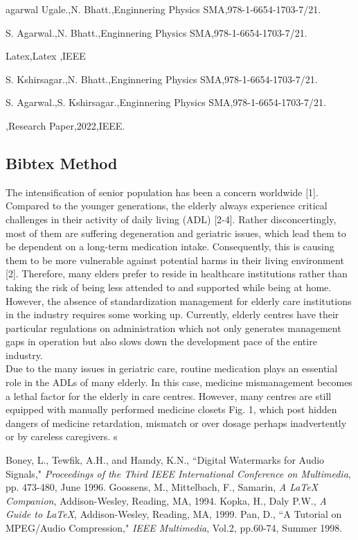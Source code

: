 \documentclass[12pt]{article}
\begin{document}
\begin{thebibliography} {}

agarwal Ugale.,N. Bhatt.,Enginnering Physics SMA,978-1-6654-1703-7/21.

 S. Agarwal.,N. Bhatt.,Enginnering Physics SMA,978-1-6654-1703-7/21.

 Latex,Latex ,IEEE

 S. Kshirsagar.,N. Bhatt.,Enginnering Physics SMA,978-1-6654-1703-7/21.

 S. Agarwal.,S. Kshirsagar.,Enginnering Physics SMA,978-1-6654-1703-7/21.

 ,Research Paper,2022,IEEE.
\end{thebibliography}
\newpage
\subsection{Bibtex Method}

The intensification of senior population has been a concern worldwide [1].
Compared to the younger generations, the elderly always experience critical
challenges in their activity of daily living (ADL) [2-4]. Rather disconcertingly,
most of them are suffering degeneration and geriatric issues, which lead them to be dependent on a long-term medication intake. Consequently, this is causing them to be more vulnerable against potential harms in their living environment [2].
Therefore, many elders prefer to reside in healthcare institutions rather than taking the risk of being less attended to and supported while being at home.\\ However, the absence of standardization management for elderly care institutions in the industry requires some working up. Currently, elderly centres have their particular regulations on administration which not only generates management gaps in operation but also slows down the development pace of the entire industry.\\
Due to the many issues in geriatric care, routine medication plays an essential
role in the ADLs of many elderly. In this case, medicine mismanagement becomes
a lethal factor for the elderly in care centres. However, many centres are still
equipped with manually performed medicine closets Fig. 1, which post hidden
dangers of medicine retardation, mismatch or over dosage perhaps inadvertently or
by careless caregivers. s


\begin{thebibliography} {}

 Boney, L., Tewfik, A.H., and Hamdy, K.N., ``Digital
Watermarks for Audio Signals," \emph{Proceedings of the Third IEEE
International Conference on Multimedia}, pp. 473-480, June 1996.
 Goossens, M., Mittelbach, F., Samarin, \emph{A LaTeX
Companion}, Addison-Wesley, Reading, MA, 1994.
 Kopka, H., Daly P.W., \emph{A Guide to LaTeX},
Addison-Wesley, Reading, MA, 1999.
 Pan, D., ``A Tutorial on MPEG/Audio Compression," \emph{IEEE
Multimedia}, Vol.2, pp.60-74, Summer 1998.
\end{thebibliography}
\end{document}
